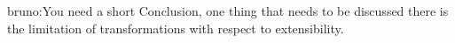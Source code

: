 \documentclass[10pt,preprint,numbers,nocopyrightspace]{sigplanconf}
\newcommand{\authornote}[3]{{\color{#2} {\sc #1}:#3}}
\newcommand{\bruno}[1]{\authornote{bruno}{red}{#1}}
\begin{document}
\begin{comment}
\category{CR-number}{subcategory}{third-level}

\terms
term1, term2

\keywords
keyword1, keyword2
\end{comment}






%
%
%
%
%
%
\bruno{You need a short Conclusion, one thing that needs to be
  discussed there is the limitation of transformations with respect 
to extensibility.}






\end{document}
